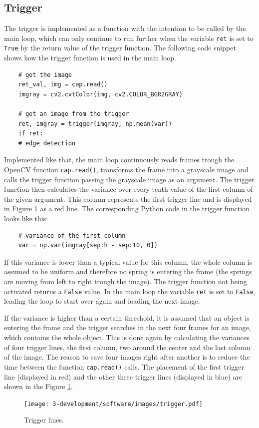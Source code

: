 \subsection{Trigger}
The trigger is implemented as a function with the intention to be called by the main loop, which can only continue to run further when the variable \texttt{ret} is set to \texttt{True} by the return value of the trigger function.
The following code snippet shows how the trigger function is used in the main loop.
\begin{lstlisting}
	# get the image
	ret_val, img = cap.read()
	imgray = cv2.cvtColor(img, cv2.COLOR_BGR2GRAY)
	
	# get an image from the trigger
	ret, imgray = trigger(imgray, np.mean(var))
	if ret:
	# edge detection
\end{lstlisting}
Implemented like that, the main loop continuously reads frames trough the OpenCV function \texttt{cap.read()}, transforms the frame into a grayscale image and calls the trigger function passing the grayscale image as an argument.
The trigger function then calculates the variance over every tenth value of the first column of the given argument. This column represents the first trigger line and is displayed in Figure \ref{development:trigger} as a red line. The corresponding Python code in the trigger function looks like this:
\begin{lstlisting}
	# variance of the first column
	var = np.var(imgray[sep:h - sep:10, 0])
\end{lstlisting}
If this variance is lower than a typical value for this column, the whole column is assumed to be uniform and therefore no spring is entering the frame (the springs are moving from left to right trough the image). 
The trigger function not being activated returns a \texttt{False} value. In the main loop the variable \texttt{ret} is set to \texttt{False}, leading the loop to start over again and loading the next image.

If the variance is higher than a certain threshold, it is assumed that an object is entering the frame and the trigger searches in the next four frames for an image, which contains the whole object.
This is done again by calculating the variances of four trigger lines, the first column, two around the center and the last column of the image. 
The reason to save four images right after another is to reduce the time between the function \texttt{cap.read()} calls. 
The placement of the first trigger line (displayed in red) and the other three trigger lines (displayed in blue) are shown in  the Figure \ref{development:trigger}.
\begin{figure}[ht]
	\centering
	\texttt{[image: 3-development/software/images/trigger.pdf]}
	\caption{Trigger lines.\label{development:trigger}}
\end{figure}

